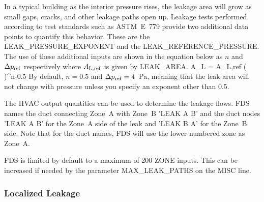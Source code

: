 \documentclass[11pt]{book}
\begin{document}
In a typical building as the interior pressure rises, the leakage area will grow as small gaps, cracks, and other leakage paths open up. Leakage tests performed according to test standards such as ASTM~E~779 provide two additional data points to quantify this behavior. These are the {\ct LEAK\_PRESSURE\_EXPONENT} and the {\ct LEAK\_REFERENCE\_PRESSURE}. The use of these additional inputs are shown in the equation below as $n$ and $\Delta p_{\rm ref}$ respectively where $A_{\rm L,ref}$ is given by {\ct LEAK\_AREA}.
\be  A_{\rm L} = A_{\rm L,ref} \left(  \right)^{n-0.5} \ee
By default, $n=0.5$ and $\Delta p_{\rm ref}=4$~Pa, meaning that the leak area will not change with pressure unless you specify an exponent other than 0.5.

The HVAC output quantities can be used to determine the leakage flows. FDS names the duct connecting Zone~A with Zone~B {\ct 'LEAK A B'} and the duct nodes {\ct 'LEAK A B'} for the Zone~A side of the leak and {\ct 'LEAK B A'} for the Zone~B side.  Note that for the duct names, FDS will use the lower numbered zone as Zone~A.

FDS is limited by default to a maximum of 200 {\ct ZONE} inputs.  This can be increased if needed by the parameter {\ct MAX\_LEAK\_PATHS} on the {\ct MISC} line.

\subsubsection{Localized Leakage}
\label{info:local_leakage}
\end{document}
